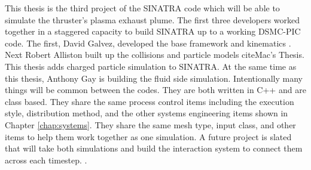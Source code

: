 \indent This thesis is the third project of the SINATRA code which will be able to simulate the thruster’s plasma exhaust plume. The first three developers worked together in a staggered capacity to build SINATRA up to a working DSMC-PIC code. The first, David Galvez, developed the base framework and kinematics \cite{Galvez2018a}. Next Robert Alliston built up the collisions and particle models cite{Mac’s Thesis}. This thesis adds charged particle simulation to SINATRA. At the same time as this thesis, Anthony Gay is building the fluid side simulation. Intentionally many things will be common between the codes. They are both written in C++ and are class based. They share the same process control items including the execution style, distribution method, and the other systems engineering items shown in Chapter \ref{chap:systems}. They share the same mesh type, input class, and other items to help them work together as one simulation. A future project is slated that will take both simulations and build the interaction system to connect them across each timestep.
. 



